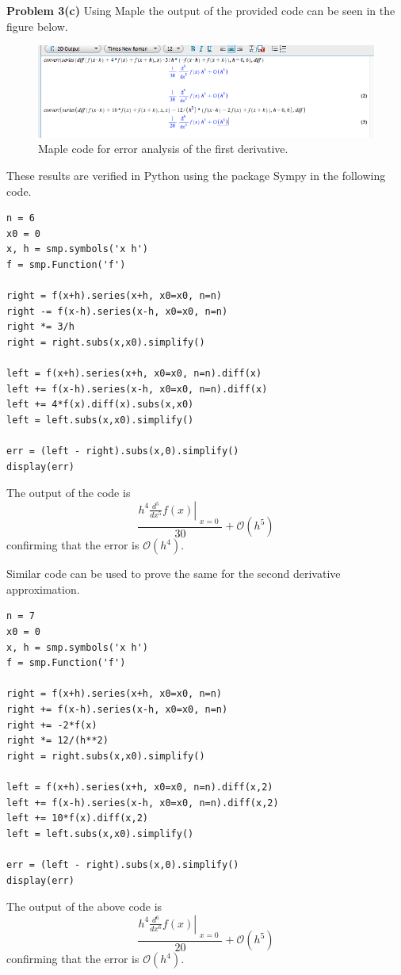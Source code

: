 \documentclass[12pt]{article}
\newcommand{\problem}[1]{\hspace{-4 ex} \large \textbf{Problem #1} }
\begin{document}
\problem{3(c)} Using Maple the output of the provided code can be seen in the figure below.
\begin{figure}[H]
	\caption{Maple code for error analysis of the first derivative.}
	\includegraphics[width=1\textwidth]{hw1_p3c_maple}
	\centering
\end{figure}
These results are verified in Python using the package Sympy in the following code.
\begin{lstlisting}
n = 6
x0 = 0
x, h = smp.symbols('x h')
f = smp.Function('f')

right = f(x+h).series(x+h, x0=x0, n=n)
right -= f(x-h).series(x-h, x0=x0, n=n)
right *= 3/h
right = right.subs(x,x0).simplify()

left = f(x+h).series(x+h, x0=x0, n=n).diff(x) 
left += f(x-h).series(x-h, x0=x0, n=n).diff(x)
left += 4*f(x).diff(x).subs(x,x0)
left = left.subs(x,x0).simplify()

err = (left - right).subs(x,0).simplify()
display(err)
\end{lstlisting}
The output of the code is
$$
\frac{h^{4} \left. \frac{d^{5}}{d x^{5}} f{\left (x \right )} \right|_{\substack{ x=0 }}}{30} + \mathcal{O}\left(h^{5}\right)
$$
confirming that the error is $\mathcal{O}(h^4)$.
\bigbreak

Similar code can be used to prove the same for the second derivative approximation.
\begin{lstlisting}
n = 7
x0 = 0
x, h = smp.symbols('x h')
f = smp.Function('f')

right = f(x+h).series(x+h, x0=x0, n=n)
right += f(x-h).series(x-h, x0=x0, n=n)
right += -2*f(x)
right *= 12/(h**2)
right = right.subs(x,x0).simplify()

left = f(x+h).series(x+h, x0=x0, n=n).diff(x,2) 
left += f(x-h).series(x-h, x0=x0, n=n).diff(x,2)
left += 10*f(x).diff(x,2)
left = left.subs(x,x0).simplify()

err = (left - right).subs(x,0).simplify()
display(err)
\end{lstlisting}
The output of the above code is
$$
\frac{h^{4} \left. \frac{d^{6}}{d x^{6}} f{\left (x \right )} \right|_{\substack{ x=0 }}}{20} + \mathcal{O}\left(h^{5}\right)
$$
confirming that the error is $\mathcal{O}(h^4)$.
\bigbreak
\end{document}
